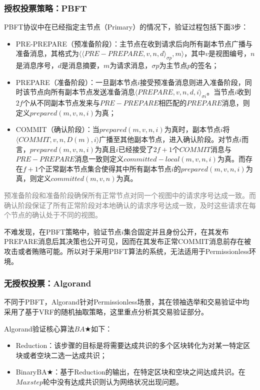 \subsubsection{授权投票策略：PBFT}
PBFT协议\cite{castro1999practical}中在已经指定主节点（Primary）的情况下，验证过程包括下面3步：
\begin{itemize}
	\item PRE-PREPARE（预准备阶段）：主节点在收到请求后向所有副本节点广播与准备消息，其格式为$\langle \langle PRE-PREPARE,v,n,d \rangle_{\sigma p},m \rangle$，其中$v$是视图编号，$n$是消息序号，$d$是消息摘要，$m$为请求消息，$\sigma p$为主节点$p$的签名；
	\item PREPARE（准备阶段）：一旦副本节点$i$接受预准备消息则进入准备阶段，同时该节点向所有副本节点发送准备消息$\langle PREPARE,v,n,d,i\rangle_{\sigma i}$。当节点$i$收到$2f$个从不同副本节点发来与$PRE-PREPARE$相匹配的$PREPARE$消息，则定义$prepared(m,v,n,i)$为真；
	\item COMMIT（确认阶段）：当$prepared(m,v,n,i)$为真时，副本节点$i$将$\langle COMMIT,v,n,D(m),i\rangle$广播至其他副本节点，进入确认阶段。对节点$i$而言，$prepared(m,v,n,i)$为真且$i$已经接受了$2f+1$个$COMMIT$消息与$PRE-PREPARE$消息一致则定义$committed-local(m,v,n,i)$为真。而存在$f+1$个正常副本节点集合使得其中所有副本节点$i$的$prepared(m,v,n,i)$为真，则定义$committed(m,v,n)$为真。
\end{itemize}

\textcolor{gray}{预准备阶段和准备阶段确保所有正常节点对同一个视图中的请求序号达成一致。而确认阶段保证了所有正常阶段对本地确认的请求序号达成一致，及时这些请求在每个节点的确认处于不同的视图。}

不难发现，在PBFT策略中，验证节点$i$集合固定并且身份公开，在其发布PREPARE消息后其决策也公开可见，因而在其发布正常COMMIT消息前存在被攻击或者贿赂可能。所以对于采用PBFT算法的系统，无法适用于Permissionless环境。

\subsubsection{无授权投票：Algorand}
不同于PBFT，Algorand\cite{gilad2017algorand}针对Permissionless场景，其在领袖选举和交易验证中均采用了基于VRF的随机抽取策略，这里重点分析其交易验证部分。

Algorand验证核心算法$BA\bigstar$如下：
\begin{itemize}
	\item Reduction：该步骤的目标是将需要达成共识的多个区块转化为对某一特定区块或者空块二选一达成共识；
	\item BinaryBA$\bigstar$：基于Reduction的输出，在特定区块和空块之间达成共识。在$Maxstep$轮中没有达成共识则认为网络状况出现问题。
\end{itemize}

